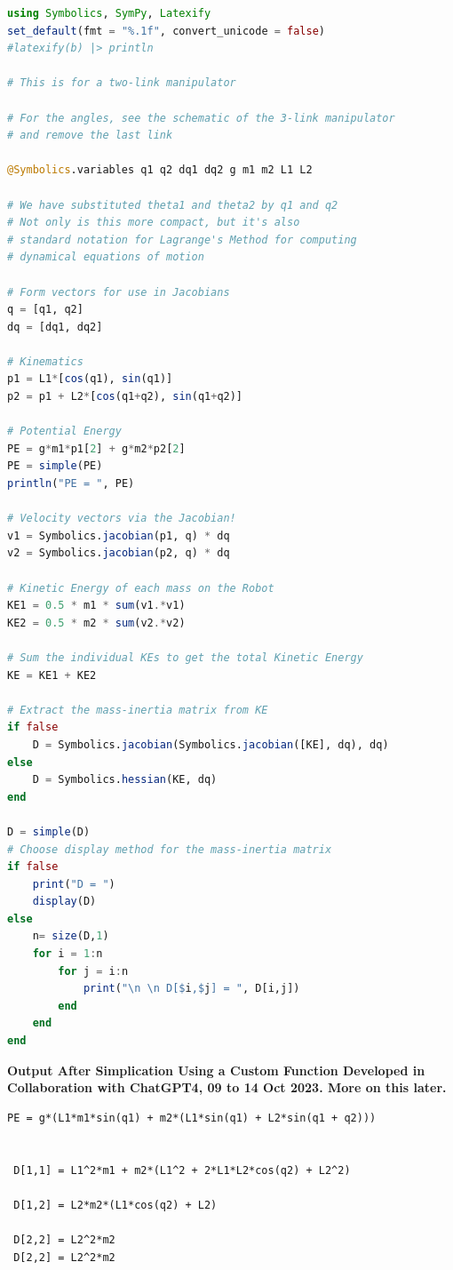 \begin{lstlisting}[language=Julia,style=mystyle]
using Symbolics, SymPy, Latexify
set_default(fmt = "%.1f", convert_unicode = false)
#latexify(b) |> println

# This is for a two-link manipulator

# For the angles, see the schematic of the 3-link manipulator
# and remove the last link

@Symbolics.variables q1 q2 dq1 dq2 g m1 m2 L1 L2

# We have substituted theta1 and theta2 by q1 and q2
# Not only is this more compact, but it's also
# standard notation for Lagrange's Method for computing
# dynamical equations of motion

# Form vectors for use in Jacobians
q = [q1, q2]
dq = [dq1, dq2]

# Kinematics
p1 = L1*[cos(q1), sin(q1)]
p2 = p1 + L2*[cos(q1+q2), sin(q1+q2)]

# Potential Energy
PE = g*m1*p1[2] + g*m2*p2[2]
PE = simple(PE)
println("PE = ", PE)

# Velocity vectors via the Jacobian!
v1 = Symbolics.jacobian(p1, q) * dq
v2 = Symbolics.jacobian(p2, q) * dq

# Kinetic Energy of each mass on the Robot
KE1 = 0.5 * m1 * sum(v1.*v1) 
KE2 = 0.5 * m2 * sum(v2.*v2)

# Sum the individual KEs to get the total Kinetic Energy
KE = KE1 + KE2

# Extract the mass-inertia matrix from KE
if false
    D = Symbolics.jacobian(Symbolics.jacobian([KE], dq), dq)
else
    D = Symbolics.hessian(KE, dq)
end

D = simple(D)
# Choose display method for the mass-inertia matrix
if false
    print("D = ")
    display(D)
else
    n= size(D,1)
    for i = 1:n
        for j = i:n
            print("\n \n D[$i,$j] = ", D[i,j])
        end
    end
end
\end{lstlisting}
\textbf{Output After Simplication Using a Custom Function Developed in Collaboration with ChatGPT4, 09 to 14 Oct 2023. More on this later.} 
\begin{verbatim}
PE = g*(L1*m1*sin(q1) + m2*(L1*sin(q1) + L2*sin(q1 + q2)))

 
 D[1,1] = L1^2*m1 + m2*(L1^2 + 2*L1*L2*cos(q2) + L2^2)
 
 D[1,2] = L2*m2*(L1*cos(q2) + L2)
 
 D[2,2] = L2^2*m2
 D[2,2] = L2^2*m2
\end{verbatim}

